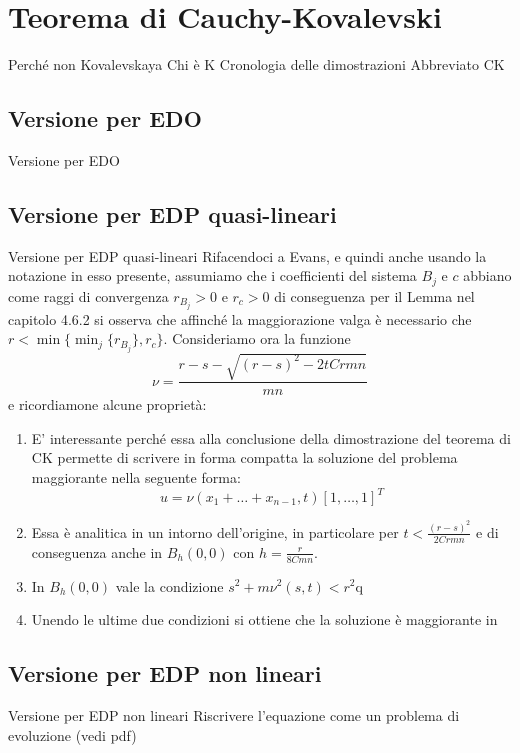 \chapter{Teorema di Cauchy-Kovalevski}

Perché non Kovalevskaya
Chi è K
Cronologia delle dimostrazioni
Abbreviato CK

\section{Versione per EDO}
Versione per EDO
\section{Versione per EDP quasi-lineari}
Versione per EDP quasi-lineari
Rifacendoci a Evans, e quindi anche usando la notazione in esso presente, 
assumiamo che i coefficienti del sistema $B_j$ e $c$ abbiano come raggi di convergenza $r_{B_j}>0$ e $r_c>0$ 
di conseguenza per il Lemma nel capitolo 4.6.2 si osserva che affinché la maggiorazione valga è necessario 
che $r<\min\{\min_{j} \{r_{B_j}\}, r_c \}$.
Consideriamo ora la funzione $$\nu=\frac{r-s-\sqrt{(r-s)^2-2tCrmn}}{mn}$$ e ricordiamone alcune proprietà:
\begin{enumerate}[1.]

\item
E' interessante perché essa alla conclusione della dimostrazione del teorema di CK 
permette di scrivere in forma compatta la soluzione del problema maggiorante nella seguente forma: 
$$u = \nu(x_1+\ldots+x_{n-1}, t)[1,\ldots,1]^T$$

\item
Essa è analitica in un intorno dell'origine, in particolare per $t<\frac{(r-s)^2}{2Crmn}$ e di 
conseguenza anche in $B_h(0,0)$ con $h=\frac{r}{8Cmn}$.

\item
In $B_h(0,0)$ vale la condizione $s^2+m\nu ^2 (s,t)< r^2$q

\item
Unendo le ultime due condizioni si ottiene che la soluzione è maggiorante in 

\end{enumerate}

\section{Versione per EDP non lineari}
Versione per EDP non lineari
Riscrivere l'equazione come un problema di evoluzione (vedi pdf)
